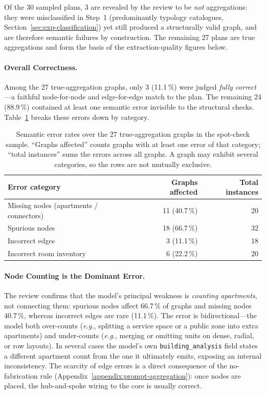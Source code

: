 \documentclass[12pt,a4paper,openright]{report}
\newcommand{\eg}{\textit{e.g.}}
\newcommand{\code}[1]{\texttt{#1}}
\begin{document}
Of the 30 sampled plans, 3 are revealed by the review to be \emph{not} aggregations: they were misclassified in Step~1 (predominantly typology catalogues, Section~\ref{sec:exp-classification}) yet still produced a structurally valid graph, and are therefore semantic failures by construction. The remaining 27 plans are true aggregations and form the basis of the extraction-quality figures below.

\paragraph{Overall Correctness.} Among the 27 true-aggregation graphs, only 3 (11.1\,\%) were judged \emph{fully correct}---a faithful node-for-node and edge-for-edge match to the plan. The remaining 24 (88.9\,\%) contained at least one semantic error invisible to the structural checks. Table~\ref{tab:spotcheck} breaks these errors down by category.

\begin{table}[ht]
\centering
\begin{tabular}{@{}lrr@{}}
\toprule
\textbf{Error category} & \textbf{Graphs affected} & \textbf{Total instances} \\
\midrule
Missing nodes (apartments / connectors) & 11 (40.7\,\%) & 20 \\
Spurious nodes                          & 18 (66.7\,\%) & 32 \\
Incorrect edges                         & 3 (11.1\,\%)  & 18 \\
Incorrect room inventory                & 6 (22.2\,\%)  & 20 \\
\bottomrule
\end{tabular}
\caption{Semantic error rates over the 27 true-aggregation graphs in the spot-check sample. ``Graphs affected'' counts graphs with at least one error of that category; ``total instances'' sums the errors across all graphs. A graph may exhibit several categories, so the rows are not mutually exclusive.}
\label{tab:spotcheck}
\end{table}

\paragraph{Node Counting is the Dominant Error.} The review confirms that the model's principal weakness is \emph{counting apartments}, not connecting them: spurious nodes affect 66.7\,\% of graphs and missing nodes 40.7\,\%, whereas incorrect edges are rare (11.1\,\%). The error is bidirectional---the model both over-counts (\eg, splitting a service space or a public zone into extra apartments) and under-counts (\eg, merging or omitting units on dense, radial, or row layouts). In several cases the model's own \code{building\_analysis} field states a different apartment count from the one it ultimately emits, exposing an internal inconsistency. The scarcity of edge errors is a direct consequence of the no-fabrication rule (Appendix~\ref{appendix:prompt-aggregation}): once nodes are placed, the hub-and-spoke wiring to the core is usually correct.
\end{document}
